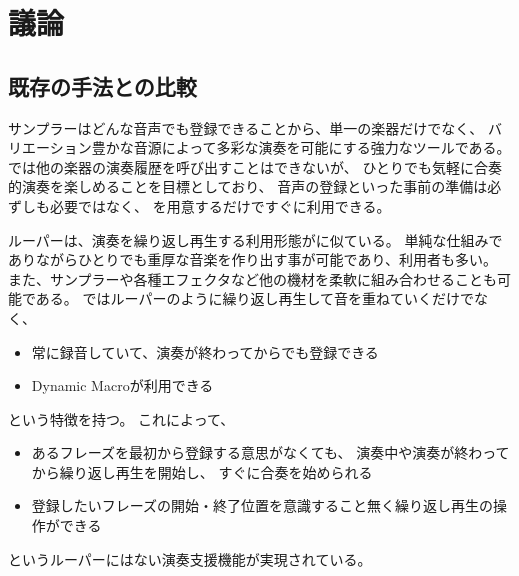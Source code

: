 \section{議論}


\subsection{既存の手法との比較}
サンプラーはどんな音声でも登録できることから、単一の楽器だけでなく、
バリエーション豊かな音源によって多彩な演奏を可能にする強力なツールである。
{\system}では他の楽器の演奏履歴を呼び出すことはできないが、
ひとりでも気軽に合奏的演奏を楽しめることを目標としており、
音声の登録といった事前の準備は必ずしも必要ではなく、
{\system}を用意するだけですぐに利用できる。

ルーパーは、演奏を繰り返し再生する利用形態が{\system}に似ている。
単純な仕組みでありながらひとりでも重厚な音楽を作り出す事が可能であり、利用者も多い。
また、サンプラーや各種エフェクタなど他の機材を柔軟に組み合わせることも可能である。
{\system}ではルーパーのように繰り返し再生して音を重ねていくだけでなく、
\begin{itemize}
\item 常に録音していて、演奏が終わってからでも登録できる
\item Dynamic Macroが利用できる
\end{itemize}
という特徴を持つ。
これによって、
\begin{itemize}
\item あるフレーズを最初から登録する意思がなくても、
  演奏中や演奏が終わってから繰り返し再生を開始し、
  すぐに合奏を始められる
\item 登録したいフレーズの開始・終了位置を意識すること無く繰り返し再生の操作ができる
\end{itemize}
というルーパーにはない演奏支援機能が実現されている。






